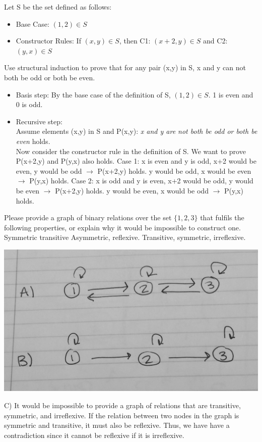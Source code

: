\documentclass[solution, letterpaper]{cs20exam}
\begin{document}
Let S be the set defined as follows:
\begin{itemize}
\item Base Case: $(1,2) \in S$
\item Constructor Rules: If $(x,y)\in S$, then C1: $(x+2, y) \in S$ and C2: $(y,x) \in S$ 
\end{itemize}
Use structural induction to prove that for any pair (x,y) in S, x and y can not both be odd or both be even. 

\begin{solution}
\begin{itemize}
\item Basis step: By the base case of the definition of S, $(1,2)\in S$. 1 is even and 0 is odd.
\item Recursive step: \\
Assume elements (x,y) in S and P(x,y): \textit{x and y are not both be odd or both be even} holds. \\
Now consider the constructor rule in the definition of S.  We want to prove P(x+2,y) and P(y,x) also holds.
\subitem Case 1:  x is even and y is odd,
		\subsubitem x+2 would be even, y would be odd $\rightarrow$ P(x+2,y) holds.
		\subsubitem y would be odd, x would be even $\rightarrow$ P(y,x) holds.
\subitem Case 2:  x is odd and y is even,
		\subsubitem x+2 would be odd, y would be even $\rightarrow$ P(x+2,y) holds.
		\subsubitem y would be even, x would be odd $\rightarrow$ P(y,x) holds.
\end{itemize}
\end{solution}

\problem{}{}
Please provide a graph of binary relations over the set $\{1,2,3\}$ that fulfils the following properties, or explain why it would be impossible to construct one. 
\subproblem Symmetric transitive
\subproblem Asymmetric, reflexive. 
\subproblem Transitive, symmetric, irreflexive. 

\begin{solution}

\includegraphics[width=15cm]{MidtermGraphs.jpg}

C) It would be impossible to provide a graph of relations that are transitive, symmetric, and irreflexive. If the relation between two nodes in the graph is symmetric and transitive, it must also be reflexive. Thus, we have have a contradiction since it cannot be reflexive if it is irreflexive. 

\end{solution}
\end{document}

